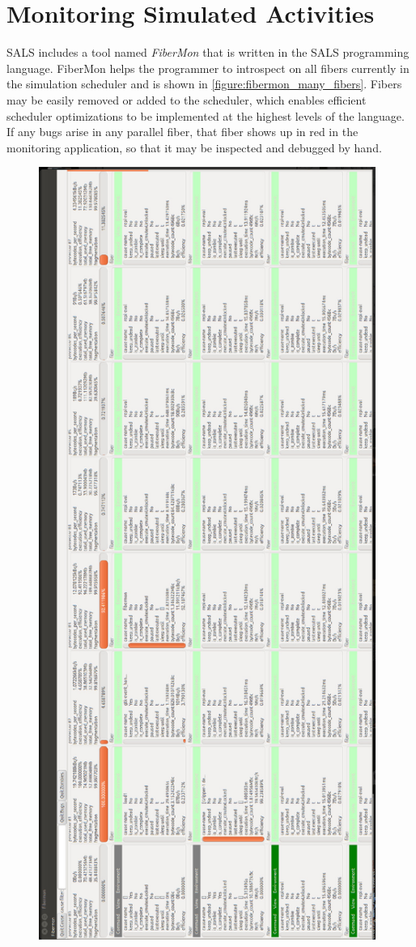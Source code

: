 \section{Monitoring Simulated Activities}

SALS includes a tool named \emph{FiberMon} that is written in the SALS
programming language.  FiberMon helps the programmer to introspect on
all fibers currently in the simulation scheduler and is shown in
\autoref{figure:fibermon_many_fibers}.  Fibers may be easily removed
or added to the scheduler, which enables efficient scheduler
optimizations to be implemented at the highest levels of the language.
If any bugs arise in any parallel fiber, that fiber shows up in red in
the monitoring application, so that it may be inspected and debugged
by hand.
\begin{figure}[bth]
  \center
  \includegraphics[width=11cm]{gfx/fibermon_many_fibers}

\end{figure}

